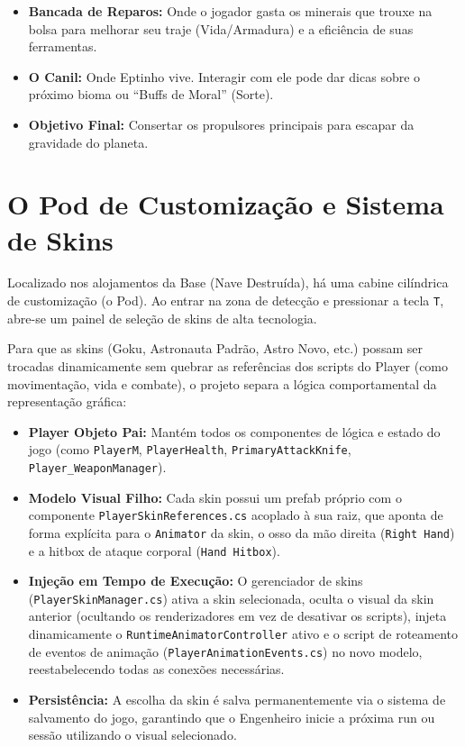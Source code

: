 \documentclass[a4paper,12pt]{report}
\begin{document}
\begin{itemize}
    \item \textbf{Bancada de Reparos:} Onde o jogador gasta os minerais que trouxe na bolsa para melhorar seu traje (Vida/Armadura) e a eficiência de suas ferramentas.
    \item \textbf{O Canil:} Onde Eptinho vive. Interagir com ele pode dar dicas sobre o próximo bioma ou ``Buffs de Moral'' (Sorte).
    \item \textbf{Objetivo Final:} Consertar os propulsores principais para escapar da gravidade do planeta.
\end{itemize}

\section{O Pod de Customização e Sistema de Skins}
Localizado nos alojamentos da Base (Nave Destruída), há uma cabine cilíndrica de customização (o Pod). Ao entrar na zona de detecção e pressionar a tecla \texttt{T}, abre-se um painel de seleção de skins de alta tecnologia.

Para que as skins (Goku, Astronauta Padrão, Astro Novo, etc.) possam ser trocadas dinamicamente sem quebrar as referências dos scripts do Player (como movimentação, vida e combate), o projeto separa a lógica comportamental da representação gráfica:

\begin{itemize}
    \item \textbf{Player Objeto Pai:} Mantém todos os componentes de lógica e estado do jogo (como \texttt{PlayerM}, \texttt{PlayerHealth}, \texttt{PrimaryAttackKnife}, \texttt{Player\_WeaponManager}).
    \item \textbf{Modelo Visual Filho:} Cada skin possui um prefab próprio com o componente \texttt{PlayerSkinReferences.cs} acoplado à sua raiz, que aponta de forma explícita para o \texttt{Animator} da skin, o osso da mão direita (\texttt{Right Hand}) e a hitbox de ataque corporal (\texttt{Hand Hitbox}).
    \item \textbf{Injeção em Tempo de Execução:} O gerenciador de skins (\texttt{PlayerSkinManager.cs}) ativa a skin selecionada, oculta o visual da skin anterior (ocultando os renderizadores em vez de desativar os scripts), injeta dinamicamente o \texttt{RuntimeAnimatorController} ativo e o script de roteamento de eventos de animação (\texttt{PlayerAnimationEvents.cs}) no novo modelo, reestabelecendo todas as conexões necessárias.
    \item \textbf{Persistência:} A escolha da skin é salva permanentemente via o sistema de salvamento do jogo, garantindo que o Engenheiro inicie a próxima run ou sessão utilizando o visual selecionado.
\end{itemize}
\end{document}
